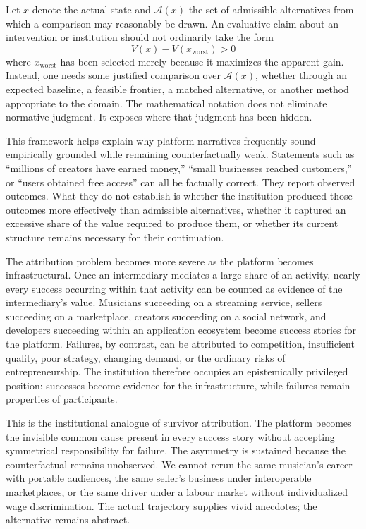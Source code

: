 \documentclass[11pt]{article}
\begin{document}
Let \(x\) denote the actual state and \(\mathcal{A}(x)\) the set of admissible alternatives from which a comparison may reasonably be drawn. An evaluative claim about an intervention or institution should not ordinarily take the form
\[
V(x)-V(x_{\mathrm{worst}})>0
\]
where \(x_{\mathrm{worst}}\) has been selected merely because it maximizes the apparent gain. Instead, one needs some justified comparison over \(\mathcal{A}(x)\), whether through an expected baseline, a feasible frontier, a matched alternative, or another method appropriate to the domain. The mathematical notation does not eliminate normative judgment. It exposes where that judgment has been hidden.

This framework helps explain why platform narratives frequently sound empirically grounded while remaining counterfactually weak. Statements such as ``millions of creators have earned money,'' ``small businesses reached customers,'' or ``users obtained free access'' can all be factually correct. They report observed outcomes. What they do not establish is whether the institution produced those outcomes more effectively than admissible alternatives, whether it captured an excessive share of the value required to produce them, or whether its current structure remains necessary for their continuation.

The attribution problem becomes more severe as the platform becomes infrastructural. Once an intermediary mediates a large share of an activity, nearly every success occurring within that activity can be counted as evidence of the intermediary's value. Musicians succeeding on a streaming service, sellers succeeding on a marketplace, creators succeeding on a social network, and developers succeeding within an application ecosystem become success stories for the platform. Failures, by contrast, can be attributed to competition, insufficient quality, poor strategy, changing demand, or the ordinary risks of entrepreneurship. The institution therefore occupies an epistemically privileged position: successes become evidence for the infrastructure, while failures remain properties of participants.

This is the institutional analogue of survivor attribution. The platform becomes the invisible common cause present in every success story without accepting symmetrical responsibility for failure. The asymmetry is sustained because the counterfactual remains unobserved. We cannot rerun the same musician's career with portable audiences, the same seller's business under interoperable marketplaces, or the same driver under a labour market without individualized wage discrimination. The actual trajectory supplies vivid anecdotes; the alternative remains abstract.
\end{document}
